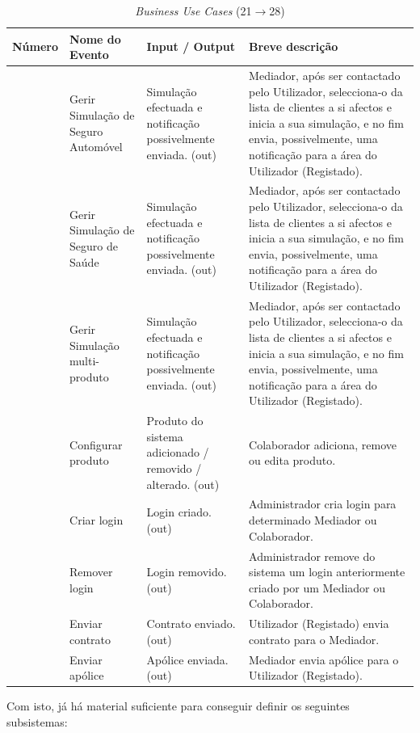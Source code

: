 \begin{table}[!htb]
	\begin{center}
		\begin{tabular}{|c|p{3cm}|p{3cm}|p{5cm}|}
		\hline
		\textbf{Número} & \textbf{Nome do Evento} & \textbf{Input / Output} & \textbf{Breve descrição}\\
		\hline
		\T \B 21 & \footnotesize{Gerir Simulação de Seguro Automóvel} & \footnotesize{Simulação efectuada e notificação possivelmente enviada. (out)} & \footnotesize{Mediador, após ser contactado pelo Utilizador, selecciona-o da lista de clientes a si afectos e inicia a sua simulação, e no fim envia, possivelmente, uma notificação para a área do Utilizador (Registado).}\\
		\hline
		\T \B 22 & \footnotesize{Gerir Simulação de Seguro de Saúde} & \footnotesize{Simulação efectuada e notificação possivelmente enviada. (out)} & \footnotesize{Mediador, após ser contactado pelo Utilizador, selecciona-o da lista de clientes a si afectos e inicia a sua simulação, e no fim envia, possivelmente, uma notificação para a área do Utilizador (Registado).}\\
		\hline
		\T \B 23 & \footnotesize{Gerir Simulação multi-produto} & \footnotesize{Simulação efectuada e notificação possivelmente enviada. (out)} & \footnotesize{Mediador, após ser contactado pelo Utilizador, selecciona-o da lista de clientes a si afectos e inicia a sua simulação, e no fim envia, possivelmente, uma notificação para a área do Utilizador (Registado).}\\
		\hline
		\T \B 24 & \footnotesize{Configurar produto} & \footnotesize{Produto do sistema adicionado / removido / alterado. (out)} & \footnotesize{Colaborador adiciona, remove ou edita produto.}\\
		\hline
		\T \B 25 & \footnotesize{Criar login} & \footnotesize{Login criado. (out)} & \footnotesize{Administrador cria login para determinado Mediador ou Colaborador.}\\
		\hline
		\T \B 26 & \footnotesize{Remover login} & \footnotesize{Login removido. (out)} & \footnotesize{Administrador remove do sistema um login anteriormente criado por um Mediador ou Colaborador.}\\
		\hline
		\T \B 27 & \footnotesize{Enviar contrato} & \footnotesize{Contrato enviado. (out)} & \footnotesize{Utilizador (Registado) envia contrato para o Mediador.}\\
		\hline
		\T \B 28 & \footnotesize{Enviar apólice} & \footnotesize{Apólice enviada. (out)} & \footnotesize{Mediador envia apólice para o Utilizador (Registado).}\\
		\hline
		\end{tabular}
		\caption{\emph{Business Use Cases} (21$\to$28)}
	\end{center}
\end{table}
\pagebreak
Com isto, já há material suficiente para conseguir definir os seguintes subsistemas:

